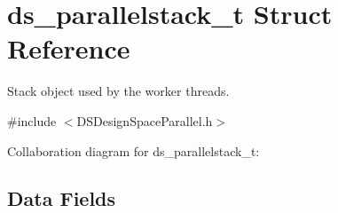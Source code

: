 \hypertarget{structds__parallelstack__t}{
\section{ds\_\-parallelstack\_\-t Struct Reference}
\label{structds__parallelstack__t}
}


Stack object used by the worker threads.  




{\ttfamily \#include $<$DSDesignSpaceParallel.h$>$}



Collaboration diagram for ds\_\-parallelstack\_\-t:\subsection*{Data Fields}
